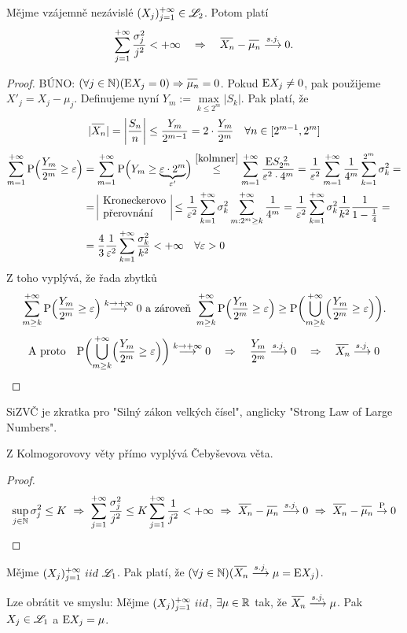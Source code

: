 \begin{theorem}
	Mějme vzájemně nezávislé $(X_j)_{j=1}^{+\infty}\in\mathscr{L}_2$. Potom platí
	$$\suminfty\frac{\sigma_j^2}{j^2}<+\infty~~~\Rightarrow~~~\oxn-\omn\sj 0.$$
		\begin{proof}
		BÚNO: $(\forall j\in\N)(\E X_j=0)\Rightarrow\omn=0$. Pokud $\mathrm{E} X_j\neq 0$, pak použijeme $X'_j=X_j-\mu_j$. 
		Definujeme nyní $Y_m:=\max\limits_{k\leq 2^m}|S_k|$. Pak platí, že 
		$$ |\oxn|= \left| \frac{S_n}{n} \right|\leq\frac{Y_m}{2^{m-1}}=2\cdot\frac{Y_m}{2^m}~~~\forall n\in[2^{m-1},2^m] $$
		\[
		\begin{split}
		\sum\limits_{m=1}^{+\infty} \mathrm{P}\Bigl( \frac{Y_m}{2^m}\geq \varepsilon \Bigr)&=\sum\limits_{m=1}^{+\infty} \mathrm{P}\Bigl( Y_m\geq \underbrace{\varepsilon\cdot 2^m}_{\varepsilon'} \Bigr)\stackrel{\ref{kolmner}}{\leq}\sum\limits_{m=1}^{+\infty}\frac{\mathrm{E} S_{2^m}^{~2}}{\varepsilon^2\cdot4^m}=\frac{1}{\varepsilon^2}\sum\limits_{m=1}^{+\infty}\frac{1}{4^m}\sum\limits_{k=1}^{2^m}\sigma_k^2= \\ &=\begin{array}{|l|}
		\text{Kroneckerovo}\\\text{přerovnání}		
		\end{array}\leq \frac{1}{\varepsilon^2}\sum\limits_{k=1}^{+\infty} \sigma_k^2\sum\limits_{m:2^m\geq k}^{+\infty}\frac{1}{4^m}=\frac{1}{\varepsilon^2}\sum\limits_{k=1}^{+\infty} \sigma_k^2\frac{1}{k^2}\frac{1}{1-\frac{1}{4}}= \\ &=\frac{4}{3}\frac{1}{\varepsilon^2}\sum\limits_{k=1}^{+\infty} \frac{\sigma_k^2}{k^2}<+\infty~~~\forall\varepsilon>0  
		\end{split}
		\] 
	Z toho vyplývá, že řada zbytků 
	$$ \sum\limits_{m\geq k}^{+\infty} \mathrm{P}\Bigl( \frac{Y_m}{2^m}\geq \varepsilon \Bigr)\stackrel{k\to+\infty}{\longrightarrow}0\text{ a zároveň }\sum\limits_{m\geq k}^{+\infty} \mathrm{P}\Bigl( \frac{Y_m}{2^m}\geq \varepsilon \Bigr)\geq  \mathrm{P}\biggl(\bigcup\limits_{m\geq k}^{+\infty} \Bigl(\frac{Y_m}{2^m}\geq \varepsilon \Bigr)\biggr). $$
	$$ \text{A proto~~~}\PP\biggl(\bigcup\limits_{m\geq k}^{+\infty} \Bigl(\frac{Y_m}{2^m}\geq \epsilon \Bigr)\biggr)\stackrel{k\to+\infty}{\longrightarrow}0~~~\Rightarrow~~~\frac{Y_m}{2^m}\sj0~~~\Rightarrow~~~\oxn\sj0 $$
	\end{proof}
\end{theorem}
\begin{remark}
	SiZVČ je zkratka pro "Silný zákon velkých čísel", anglicky "Strong Law of Large Numbers".
\end{remark}
\begin{remark}
	Z Kolmogorovovy věty přímo vyplývá Čebyševova věta. \begin{proof}
		$$ \sup\limits_{j\in\N} \sigma_j^2\leq K~\Rightarrow~ \suminfty \frac{\sigma_j^2}{j^2}\leq K\suminfty \frac{1}{j^2}<+\infty~\Rightarrow~\oxn-\omn\sj 0~\Rightarrow~\oxn-\omn\Pto 0 $$
	\end{proof}
\end{remark}
\begin{theorem}[Kolmogorov 2]
	Mějme $(X_j)_{j=1}^{+\infty}~iid~\mathscr{L}_1$. Pak platí, že $(\forall j\in\N)(\oxn\sj\mu =\E X_j)$.
\end{theorem}
\begin{remark}
	Lze obrátit ve smyslu: Mějme $(X_j)_{j=1}^{+\infty}~iid$, $\exists\mu\in\mathbb{R}$ tak, že $\oxn\sj\mu$. Pak $X_j\in\mathscr{L}_1$ a $\mathrm{E} X_j=\mu$.
\end{remark}

